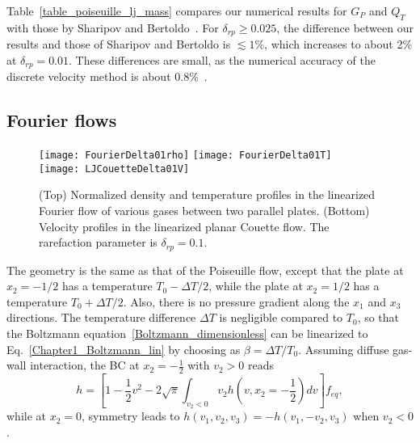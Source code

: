 Table~\ref{table_poiseuille_lj_mass} compares our numerical results for $G_P$ and $Q_T$ with those by Sharipov and Bertoldo~\cite{Sharipov2009}. For $\delta_{rp}\ge0.025$, the difference between our results and those of Sharipov and Bertoldo is $\lesssim1\%$, which increases to about 2\% at $\delta_{rp}=0.01$. These differences are small, as the numerical accuracy of the discrete velocity method is about 0.8\%~\cite{Sharipov2009}. 





\subsection{Fourier flows}\label{Fourier_lin_FSM}


\begin{figure}[t]
	\centering
	\texttt{[image: FourierDelta01rho]}
	\hskip 0.4cm
	\texttt{[image: FourierDelta01T]}\\
	\vskip 0.5cm
	\texttt{[image: LJCouetteDelta01V]}
	\caption{
		(Top) Normalized density and temperature profiles in the linearized Fourier flow of various gases between two parallel plates. (Bottom) Velocity profiles in the linearized planar Couette flow. The rarefaction parameter is $\delta_{rp}=0.1$. 
	}
	\label{Fourier_lin}
\end{figure}

The geometry is the same as that of the Poiseuille flow, except that the plate at $x_2=-1/2$ has a temperature $T_0-\Delta{T}/2$, while the plate at $x_2=1/2$ has a temperature $T_0+\Delta{T}/2$. Also, there is no pressure gradient along the $x_1$ and $x_3$ directions. The temperature difference $\Delta{T}$ is negligible compared to $T_0$, so that the Boltzmann equation~\eqref{Boltzmann_dimensionless} can be linearized to Eq.~\eqref{Chapter1_Boltzmann_lin} by choosing as $\beta=\Delta{T}/T_0$. Assuming diffuse gas-wall interaction, the BC at $x_2=-\frac{1}{2}$ with ${v_2>0}$ reads
\begin{equation}
h= \left[ 1-\frac{1}{2}v^2-2\sqrt{\pi}\int_{v_2<0} v_2h\left(v,x_2=-\frac{1}{2}\right)dv\right] f_{eq}, 
\end{equation}
while at $x_2=0$, symmetry leads to $h(v_1,v_2,v_3)=-h(v_1,-v_2,v_3)$ when $v_2<0$.



